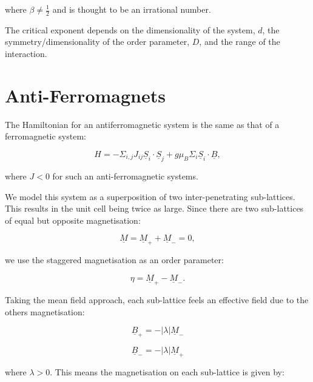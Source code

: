 \noindent where $\beta \neq \frac{1}{2}$ and is thought to be an irrational number.

\noindent The critical exponent depends on the dimensionality of the system, $d$, the symmetry/dimensionality of the order parameter, $D$, and the range of the interaction. 

\section{Anti-Ferromagnets}

The Hamiltonian for an antiferromagnetic system is the same as that of a ferromagnetic system:

\begin{equation}
    H = -\Sigma_{i,j} J_{ij} \underline{S}_i \cdot \underline{S}_j + g \mu_B \Sigma_i \underline{S}_i \cdot \underline{B},
    \label{AntiFerromagneticHamiltonian}
\end{equation}

\noindent where $J < 0$ for such an anti-ferromagnetic systems.

\noindent We model this system as a superposition of two inter-penetrating sub-lattices. This results in the unit cell being twice as large.
Since there are two sub-lattices of equal but opposite magnetisation:

\begin{equation}
    \underline{M} = \underline{M}_+ + \underline{M}_- = 0,
    \label{OverallMagnetisationAntiFerromagnet}
\end{equation}

\noindent we use the staggered magnetisation as an order parameter:

\begin{equation}
    \eta = \underline{M}_+ - \underline{M}_-.
    \label{StaggeredMagnetisation}
\end{equation}

\noindent Taking the mean field approach, each sub-lattice feels an effective field due to the others magnetisation:

\begin{equation}
    \underline{B}_+ = - |\lambda| \underline{M}_-
\end{equation}

\begin{equation}
    \underline{B}_- = - |\lambda| \underline{M}_+
\end{equation}

\noindent where $\lambda > 0$. This means the magnetisation on each sub-lattice is given by:


